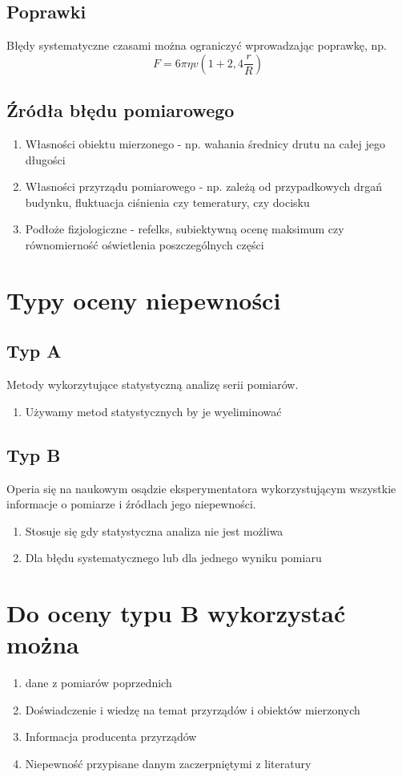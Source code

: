 \documentclass[11pt]{article}
\begin{document}
\subsection{Poprawki}
Błędy systematyczne czasami można ograniczyć wprowadzając poprawkę, np.
$$ F = 6\pi \eta v(1 + 2,4\frac{r}{R}) $$

\subsection{Źródła błędu pomiarowego}
\begin{enumerate}
\item{Własności obiektu mierzonego - np. wahania średnicy drutu na całej jego długości}
\item{Własności przyrządu pomiarowego - np. zależą od przypadkowych drgań budynku, fluktuacja ciśnienia czy temeratury, czy docisku}
\item{Podłoże fizjologiczne - refelks, subiektywną ocenę maksimum czy równomierność oświetlenia poszczególnych części}
\end{enumerate}

\section{Typy oceny niepewności}
\subsection{Typ A}
Metody wykorzytujące statystyczną analizę serii pomiarów.
\begin{enumerate}
\item{Używamy metod statystycznych by je wyeliminować}
\end{enumerate}
\subsection{Typ B}
Operia się na naukowym osądzie eksperymentatora wykorzystującym wszystkie informacje o pomiarze i źródłach jego niepewności.
\begin{enumerate}
\item{Stosuje się gdy statystyczna analiza nie jest możliwa}
\item{Dla błędu systematycznego lub dla jednego wyniku pomiaru}
\end{enumerate}

\section{Do oceny typu B wykorzystać można}
\begin{enumerate}
\item{dane z pomiarów poprzednich}
\item{Doświadczenie i wiedzę na temat przyrządów i obiektów mierzonych}
\item{Informacja producenta przyrządów}
\item{Niepewność przypisane danym zaczerpniętymi z literatury}
\end{enumerate}
\end{document}
